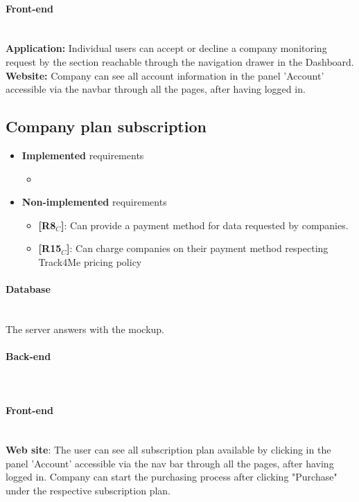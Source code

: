 \paragraph{Front-end} \mbox{}\\
\textbf{Application:} Individual users can accept or decline a company monitoring request by the section reachable through the navigation drawer in the Dashboard.\\
\textbf{Website:} Company can see all account information in the panel 'Account' accessible via the navbar through all the pages, after having logged in.\\

\subsection{Company plan subscription }
\begin{itemize}
    \item \textbf{Implemented} requirements
        \begin{itemize}
            \item 
        \end{itemize}
    \item \textbf{Non-implemented} requirements
    \begin{itemize}
    \item \textbf{[R8$_C$]}: Can provide a payment method for data requested by companies.
    \item \textbf{[R15$_C$]}: Can charge companies on their payment method respecting Track4Me pricing policy
        \end{itemize}
\end{itemize}

\paragraph{Database} \mbox{}\\ 
The server answers with the mockup.
\paragraph{Back-end} \mbox{}\\  
\paragraph{Front-end} \mbox{}\\
\textbf{Web site}: The user can see all subscription plan available by clicking in the panel 'Account' accessible via the nav bar through all the pages, after having logged in.
Company can start the purchasing process after clicking "Purchase" under the respective subscription plan.



